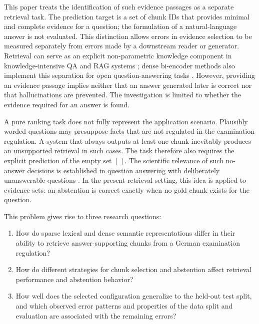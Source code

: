 \documentclass[11pt]{article}
\begin{document}
This paper treats the identification of such evidence passages as a separate retrieval task. The prediction target is a set of chunk IDs that provides minimal and complete evidence for a question; the formulation of a natural-language answer is not evaluated. This distinction allows errors in evidence selection to be measured separately from errors made by a downstream reader or generator. Retrieval can serve as an explicit non-parametric knowledge component in knowledge-intensive QA and RAG systems \citep{lewis2020rag}; dense bi-encoder methods also implement this separation for open question-answering tasks \citep{karpukhin-etal-2020-dense}. However, providing an evidence passage implies neither that an answer generated later is correct nor that hallucinations are prevented. The investigation is limited to whether the evidence required for an answer is found.

A pure ranking task does not fully represent the application scenario. Plausibly worded questions may presuppose facts that are not regulated in the examination regulation. A system that always outputs at least one chunk inevitably produces an unsupported retrieval in such cases. The task therefore also requires the explicit prediction of the empty set $[\,]$. The scientific relevance of such no-answer decisions is established in question answering with deliberately unanswerable questions \citep{rajpurkar-etal-2018-know}. In the present retrieval setting, this idea is applied to evidence sets: an abstention is correct exactly when no gold chunk exists for the question.

This problem gives rise to three research questions:

\begin{enumerate}
    \item[\textbf{RQ1}] How do sparse lexical and dense semantic representations differ in their ability to retrieve answer-supporting chunks from a German examination regulation?
    \item[\textbf{RQ2}] How do different strategies for chunk selection and abstention affect retrieval performance and abstention behavior?
    \item[\textbf{RQ3}] How well does the selected configuration generalize to the held-out test split, and which observed error patterns and properties of the data split and evaluation are associated with the remaining errors?
\end{enumerate}
\end{document}
